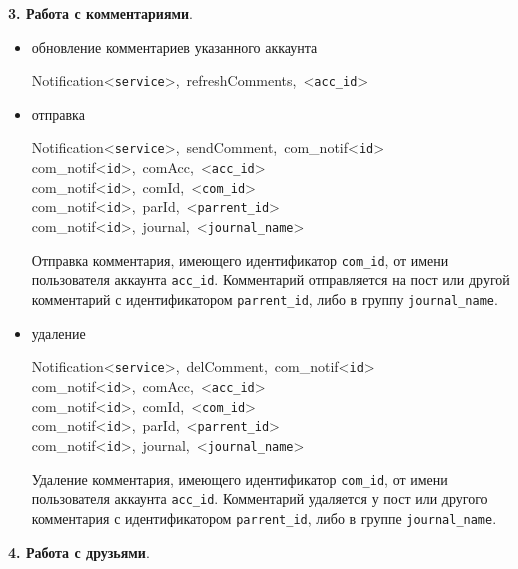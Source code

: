 {\bf 3. Работа с комментариями}.

\begin{itemize}
\item обновление комментариев указанного аккаунта

\mbox{Notification<{\tt service}>, refreshComments, <{\tt acc\_id}>}

\item отправка

\mbox{Notification<{\tt service}>, sendComment, com\_notif<{\tt id}>}\\
\mbox{com\_notif<{\tt id}>, comAcc, <{\tt acc\_id}>}\\
\mbox{com\_notif<{\tt id}>, comId, <{\tt com\_id}>}\\
\mbox{com\_notif<{\tt id}>, parId, <{\tt parrent\_id}>}\\
\mbox{com\_notif<{\tt id}>, journal, <{\tt journal\_name}>}

Отправка комментария, имеющего идентификатор {\tt com\_id}, от имени пользователя аккаунта {\tt acc\_id}. Комментарий отправляется на пост или другой комментарий с идентификатором {\tt parrent\_id}, либо в группу {\tt journal\_name}.

\item удаление

\mbox{Notification<{\tt service}>, delComment, com\_notif<{\tt id}>}\\
\mbox{com\_notif<{\tt id}>, comAcc, <{\tt acc\_id}>}\\
\mbox{com\_notif<{\tt id}>, comId, <{\tt com\_id}>}\\
\mbox{com\_notif<{\tt id}>, parId, <{\tt parrent\_id}>}\\
\mbox{com\_notif<{\tt id}>, journal, <{\tt journal\_name}>}

Удаление комментария, имеющего идентификатор {\tt com\_id}, от имени пользователя аккаунта {\tt acc\_id}. Комментарий удаляется у пост или другого комментария с идентификатором {\tt parrent\_id}, либо в группе {\tt journal\_name}.

\end{itemize}
\newpage
{\bf 4. Работа с друзьями}.

